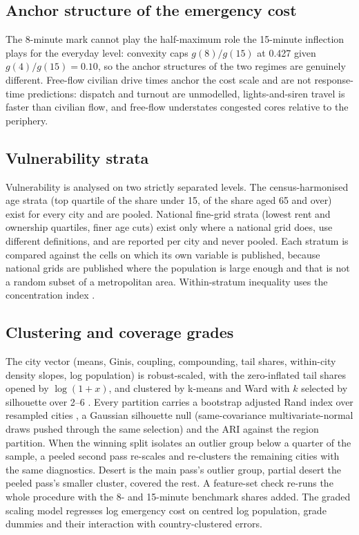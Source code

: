 \documentclass[11pt]{article}
\begin{document}
\subsection{Anchor structure of the emergency cost}
The 8-minute mark cannot play the half-maximum role the 15-minute
inflection plays for the everyday level: convexity caps $g(8)/g(15)$ at
0.427 given $g(4)/g(15) = 0.10$, so the anchor structures of the two
regimes are genuinely different. Free-flow civilian drive times anchor the
cost scale and are not response-time predictions: dispatch and turnout are
unmodelled, lights-and-siren travel is faster than civilian flow, and
free-flow understates congested cores relative to the periphery.

\subsection{Vulnerability strata}
Vulnerability is analysed on two strictly separated levels. The
census-harmonised age strata (top quartile of the share under 15, of the
share aged 65 and over) exist for every city and are pooled. National
fine-grid strata (lowest rent and ownership quartiles, finer age cuts)
exist only where a national grid does, use different definitions, and are
reported per city and never pooled. Each stratum is compared against the
cells on which its own variable is published, because national grids are
published where the population is large enough and that is not a random
subset of a metropolitan area. Within-stratum inequality uses the
concentration index \citep{wagstaff1991measurement}.

\subsection{Clustering and coverage grades}
The city vector (means, Ginis, coupling, compounding, tail shares,
within-city density slopes, log population) is robust-scaled, with the
zero-inflated tail shares opened by $\log(1+x)$, and clustered by k-means
and Ward with $k$ selected by silhouette over 2--6
\citep{rousseeuw1987silhouettes}. Every partition carries a bootstrap
adjusted Rand index over resampled cities \citep{hubert1985comparing}, a
Gaussian silhouette null (same-covariance multivariate-normal draws pushed
through the same selection) and the ARI against the region partition. When
the winning split isolates an outlier group below a quarter of the sample,
a peeled second pass re-scales and re-clusters the remaining cities with
the same diagnostics. Desert is the main pass's outlier group, partial
desert the peeled pass's smaller cluster, covered the rest. A feature-set
check re-runs the whole procedure with the 8- and 15-minute benchmark
shares added. The graded scaling model regresses log emergency cost on
centred log population, grade dummies and their interaction with
country-clustered errors.
\end{document}
